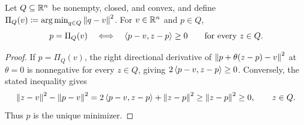 \begin{Thm:Lemma}\label{lem:intro:projection}
Let $Q\subseteq\mathbb{R}^n$ be nonempty, closed, and convex, and define
$\Pi_Q(v)\coloneqq\operatorname*{arg\,min}_{q\in Q}\left\lVert q-v \right\rVert^2$. For $v\in\mathbb{R}^n$ and $p\in Q$,
\begin{equation}\label{eq:intro:projection-optimality}
 p=\Pi_Q(v)
 \quad\Longleftrightarrow\quad
 \left\langle p-v,z-p \right\rangle\ge0\qquad\text{for every }z\in Q.
\end{equation}
\end{Thm:Lemma}
\begin{proof}
If $p=\Pi_Q(v)$, the right directional derivative of
$\left\lVert p+\theta(z-p)-v \right\rVert^2$ at $\theta=0$ is nonnegative for every
$z\in Q$, giving $2\left\langle p-v,z-p \right\rangle\ge0$.
Conversely, the stated inequality gives
\[
 \left\lVert z-v \right\rVert^2-\left\lVert p-v \right\rVert^2
 =2\left\langle p-v,z-p \right\rangle+\left\lVert z-p \right\rVert^2
 \ge\left\lVert z-p \right\rVert^2\ge0,
 \qquad z\in Q.
\]
Thus $p$ is the unique minimizer.
\end{proof}
